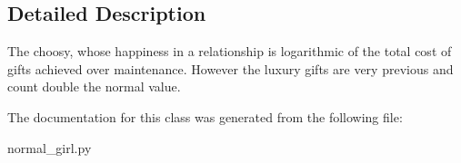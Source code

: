 \subsection{Detailed Description}
\begin{DoxyVerb}The choosy, whose happiness in a relationship is logarithmic of the total cost of gifts achieved over maintenance. However the luxury gifts are very previous and count double the normal value.
\end{DoxyVerb}
 

The documentation for this class was generated from the following file\+:\begin{DoxyCompactItemize}
\item 
normal\+\_\+girl.\+py\end{DoxyCompactItemize}
